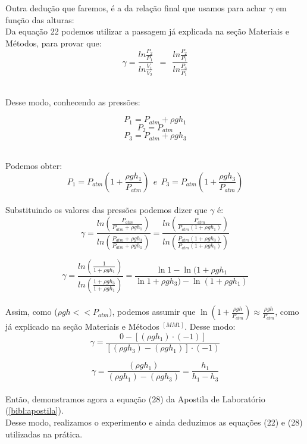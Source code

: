 Outra dedução que faremos, é a da relação final que usamos para achar $\gamma$ em função das alturas:\\

Da equação 22 podemos utilizar a passagem já explicada na seção Materiais e Métodos, para provar que:
\[ \gamma = \frac{ln\frac{P_2}{P_1}}{ln\frac{V_1}{V_2}} \ \ = \ \ \frac{ln\frac{P_2}{P_1}}{ln\frac{P_3}{P_1}} \] \

Desse modo, conhecendo as pressões:

\[ P_1 = P_{atm} + \rho g h_1 \]
\[ P_2 = P_{atm} \]
\[ P_3 = P_{atm} + \rho g h_3 \] \

Podemos obter:
\[ P_1 = P_{atm}\left( 1+\frac{\rho g h_1}{P_{atm}}\right) \ \  e  \ \ P_3 = P_{atm}\left(1+\frac{\rho g h_3}{P_{atm}}\right) \]\\

Substituindo os valores das pressões podemos dizer que $\gamma$ é:\\
\[ \gamma = \frac{ln\left(\frac{P_{atm}}{P_{atm}+\rho g h_1}\right) }{ln\left (\frac{P_{atm}+\rho g h_3}{P_{atm}+\rho g h_1}\right) } = \frac{ln\left(\frac{P_{atm}}{P_{atm}(1 + \rho g h_1)}\right) }{ln\left (\frac{P_{atm} ( 1 + \rho g h_3)}{P_{atm} ( 1 + \rho g h_1)}\right) } \]

\[ \gamma = \frac{ln\left(\frac{1}{1 + \rho g h_1}\right)}{ln\left (\frac{1 + \rho g h_3}{ 1 + \rho g h_1}\right) }  =  \frac{\ln{1}-\ln{(1+\rho g h_1}}{\ln{1+ \rho g h_3)} - \ln{(1+\rho g h_1)}}\]\\

Assim, como ($ \rho g h << P_{atm}$), podemos assumir que $\ln{\left(1+ \frac{\rho g h}{P_{atm}}\right)} \approx \frac{\rho g h}{P_{atm}} $, como já explicado na seção Materiais e Métodos $^{[MM1]}$. Desse modo:\\

\[ \gamma = \frac{0 - [(\rho g h_1) \cdot (-1)]}{[(\rho g h_3) - (\rho g h_1)] \cdot (-1)}\]

\[ \gamma = \frac{(\rho g h_1)}{(\rho g h_1) - (\rho g h_3)} = \frac{h_1}{h_1 - h_3}\] \\

Então, demonstramos agora a equação (28) da Apostila de Laboratório (\ref{bibl:apostila}).\\

Desse modo, realizamos o experimento e ainda deduzimos as equações (22) e (28) utilizadas na prática. \\
